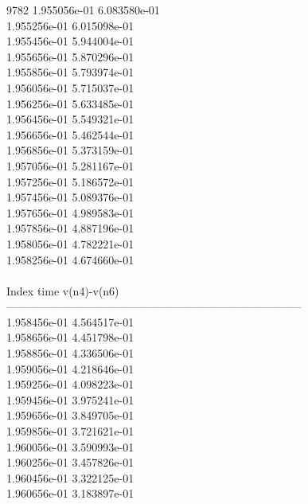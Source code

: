 9782	1.955056e-01	6.083580e-01	\\ 	1.955256e-01	6.015098e-01	\\ 	1.955456e-01	5.944004e-01	\\ 	1.955656e-01	5.870296e-01	\\ 	1.955856e-01	5.793974e-01	\\ 	1.956056e-01	5.715037e-01	\\ 	1.956256e-01	5.633485e-01	\\ 	1.956456e-01	5.549321e-01	\\ 	1.956656e-01	5.462544e-01	\\ 	1.956856e-01	5.373159e-01	\\ 	1.957056e-01	5.281167e-01	\\ 	1.957256e-01	5.186572e-01	\\ 	1.957456e-01	5.089376e-01	\\ 	1.957656e-01	4.989583e-01	\\ 	1.957856e-01	4.887196e-01	\\ 	1.958056e-01	4.782221e-01	\\ 	1.958256e-01	4.674660e-01	\\ \hline
\\ \hline
Index   time            v(n4)-v(n6)     \\ \hline
--------------------------------------------------------------------------------\\ 	1.958456e-01	4.564517e-01	\\ 	1.958656e-01	4.451798e-01	\\ 	1.958856e-01	4.336506e-01	\\ 	1.959056e-01	4.218646e-01	\\ 	1.959256e-01	4.098223e-01	\\ 	1.959456e-01	3.975241e-01	\\ 	1.959656e-01	3.849705e-01	\\ 	1.959856e-01	3.721621e-01	\\ 	1.960056e-01	3.590993e-01	\\ 	1.960256e-01	3.457826e-01	\\ 	1.960456e-01	3.322125e-01	\\ 	1.960656e-01	3.183897e-01	\\ \hline
